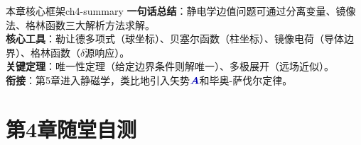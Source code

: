 \documentclass[11pt,a4paper,openany,oneside]{book}
\newcommand{\vecA}{\textcolor{blue!70!black}{\vect{A}}}
\newcommand{\vect}[1]{\bm{#1}}
\begin{document}
\begin{tip}{本章核心框架}{ch4-summary}
\textbf{一句话总结}：静电学边值问题可通过分离变量、镜像法、格林函数三大解析方法求解。\\
\textbf{核心工具}：勒让德多项式（球坐标）、贝塞尔函数（柱坐标）、镜像电荷（导体边界）、格林函数（$\delta$源响应）。\\
\textbf{关键定理}：唯一性定理（给定边界条件则解唯一）、多极展开（远场近似）。\\
\textbf{衔接}：第5章进入静磁学，类比地引入矢势$\vecA$和毕奥-萨伐尔定律。
\end{tip}

\section*{第4章随堂自测}
\end{document}
